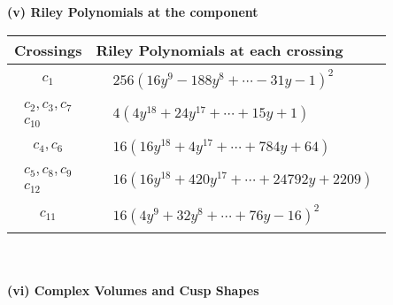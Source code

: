 \documentclass[1p]{elsarticle_modified}
\theoremstyle{definition}
\begin{document}
\flushleft \textbf{(v) Riley Polynomials at the component}\newline \\
\begin{tabular}{m{50pt}|m{274pt}}
Crossings & \hspace{64pt}Riley Polynomials at each crossing \\
\hline $$\begin{aligned}c_{1}\end{aligned}$$&$\begin{aligned}
&256(16 y^9-188 y^8+\cdots-31 y-1)^{2}
\end{aligned}$\\
\hline $$\begin{aligned}c_{2},c_{3},c_{7}\\c_{10}\end{aligned}$$&$\begin{aligned}
&4(4 y^{18}+24 y^{17}+\cdots+15 y+1)
\end{aligned}$\\
\hline $$\begin{aligned}c_{4},c_{6}\end{aligned}$$&$\begin{aligned}
&16(16 y^{18}+4 y^{17}+\cdots+784 y+64)
\end{aligned}$\\
\hline $$\begin{aligned}c_{5},c_{8},c_{9}\\c_{12}\end{aligned}$$&$\begin{aligned}
&16(16 y^{18}+420 y^{17}+\cdots+24792 y+2209)
\end{aligned}$\\
\hline $$\begin{aligned}c_{11}\end{aligned}$$&$\begin{aligned}
&16(4 y^9+32 y^8+\cdots+76 y-16)^{2}
\end{aligned}$\\
\hline
\end{tabular}\\~\\
\newpage\flushleft \textbf{(vi) Complex Volumes and Cusp Shapes}
\end{document}
